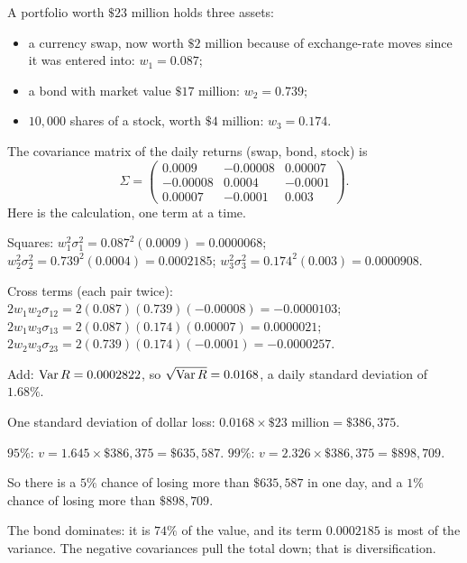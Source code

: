 \begin{example}
\label{ex:var3}
A portfolio worth $\$23$ million holds three assets:
\begin{itemize}
  \item a currency swap, now worth $\$2$ million because of exchange-rate moves since it was entered into: $w_1=0.087$;
  \item a bond with market value $\$17$ million: $w_2=0.739$;
  \item $10{,}000$ shares of a stock, worth $\$4$ million: $w_3=0.174$.
\end{itemize}
The covariance matrix of the daily returns (swap, bond, stock) is
\[
  \Sigma=\begin{pmatrix}0.0009&-0.00008&0.00007\\-0.00008&0.0004&-0.0001\\0.00007&-0.0001&0.003\end{pmatrix}.
\]
Here is the calculation, one term at a time.
\begin{steps}
  \item Squares: $w_1^2\sigma_1^2=0.087^2(0.0009)=0.0000068$; $w_2^2\sigma_2^2=0.739^2(0.0004)=0.0002185$; $w_3^2\sigma_3^2=0.174^2(0.003)=0.0000908$.
  \item Cross terms (each pair twice): $2w_1w_2\sigma_{12}=2(0.087)(0.739)(-0.00008)=-0.0000103$; $2w_1w_3\sigma_{13}=2(0.087)(0.174)(0.00007)=0.0000021$; $2w_2w_3\sigma_{23}=2(0.739)(0.174)(-0.0001)=-0.0000257$.
  \item Add: $\operatorname{Var} R=0.0002822$, so $\sqrt{\operatorname{Var} R}=0.0168$, a daily standard deviation of $1.68\%$.
  \item One standard deviation of dollar loss: $0.0168\times\$23\text{ million}=\$386{,}375$.
  \item $95\%$: $v=1.645\times\$386{,}375=\$635{,}587$. $99\%$: $v=2.326\times\$386{,}375=\$898{,}709$.
\end{steps}
So there is a $5\%$ chance of losing more than $\$635{,}587$ in one day, and a $1\%$ chance of losing more than $\$898{,}709$.
\end{example}

The bond dominates: it is $74\%$ of the value, and its term $0.0002185$ is most of the variance. The negative covariances pull the total down; that is diversification.


